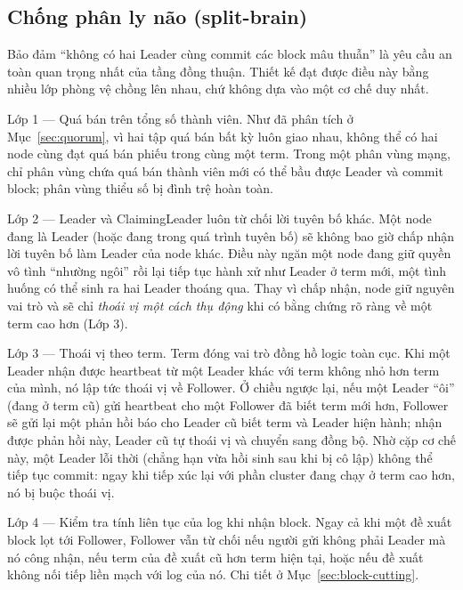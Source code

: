 \subsection{Chống phân ly não (split-brain)}
\label{sec:ordering-splitbrain}

Bảo đảm ``không có hai Leader cùng commit các block mâu thuẫn'' là yêu cầu an toàn
quan trọng nhất của tầng đồng thuận. Thiết kế đạt được điều này bằng nhiều
lớp phòng vệ chồng lên nhau, chứ không dựa vào một cơ chế duy nhất.

Lớp 1 --- Quá bán trên tổng số thành viên. Như đã phân tích ở
Mục~\ref{sec:quorum}, vì hai tập quá bán bất kỳ luôn giao nhau, không thể có hai
node cùng đạt quá bán phiếu trong cùng một term. Trong một phân vùng mạng, chỉ phân
vùng chứa quá bán thành viên mới có thể bầu được Leader và commit block; phân vùng
thiểu số bị đình trệ hoàn toàn.

Lớp 2 --- Leader và ClaimingLeader luôn từ chối lời tuyên bố khác. Một
node đang là Leader (hoặc đang trong quá trình tuyên bố) sẽ không bao giờ chấp
nhận lời tuyên bố làm Leader của node khác. Điều này ngăn một node đang giữ quyền
vô tình ``nhường ngôi'' rồi lại tiếp tục hành xử như Leader ở term mới, một tình
huống có thể sinh ra hai Leader thoáng qua. Thay vì chấp nhận, node giữ nguyên vai
trò và sẽ chỉ \textit{thoái vị một cách thụ động} khi có bằng chứng rõ ràng về một
term cao hơn (Lớp 3).

Lớp 3 --- Thoái vị theo term. Term đóng vai trò đồng hồ logic toàn cục.
Khi một Leader nhận được heartbeat từ một Leader khác với term không nhỏ hơn term
của mình, nó lập tức thoái vị về Follower. Ở chiều ngược lại, nếu một Leader ``ôi''
(đang ở term cũ) gửi heartbeat cho một Follower đã biết term mới hơn, Follower sẽ
gửi lại một phản hồi báo cho Leader cũ biết term và Leader hiện hành; nhận được
phản hồi này, Leader cũ tự thoái vị và chuyển sang đồng bộ. Nhờ cặp cơ chế này, một
Leader lỗi thời (chẳng hạn vừa hồi sinh sau khi bị cô lập) không thể tiếp tục
commit: ngay khi tiếp xúc lại với phần cluster đang chạy ở term cao hơn, nó bị buộc
thoái vị.

Lớp 4 --- Kiểm tra tính liên tục của log khi nhận block. Ngay cả khi một
đề xuất block lọt tới Follower, Follower vẫn từ chối nếu người gửi không phải Leader
mà nó công nhận, nếu term của đề xuất cũ hơn term hiện tại, hoặc nếu đề xuất không
nối tiếp liền mạch với log của nó. Chi tiết ở Mục~\ref{sec:block-cutting}.

